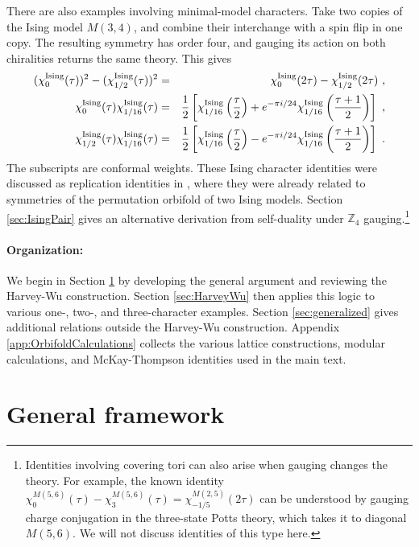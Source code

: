 \documentclass[12pt]{article}
\numberwithin{equation}{section}
\newcommand{\bea}{\begin{eqnarray}}
\newcommand{\eea}{\end{eqnarray}}
\def\no{\nonumber}
\theoremstyle{remark}
\begin{document}
There are also examples involving minimal-model characters. Take two copies of the Ising model $M(3,4)$, and combine their interchange with a spin flip in one copy. The resulting symmetry has order four, and gauging its action on both chiralities returns the same theory.  This gives
\bea 
\label{eq:IsingPairRelations}
(\chi^{\mathrm{Ising}}_0(\tau))^2-(\chi^{\mathrm{Ising}}_{1/2}(\tau))^2
&=&\chi^{\mathrm{Ising}}_0(2\tau)-\chi^{\mathrm{Ising}}_{1/2}(2\tau)~,\no\\
\chi^{\mathrm{Ising}}_0(\tau)\chi^{\mathrm{Ising}}_{1/16}(\tau)
&=&{1\over2}\left[\chi^{\mathrm{Ising}}_{1/16}\left({\tau\over2}\right)+e^{-\pi i/24}\chi^{\mathrm{Ising}}_{1/16}\left({\tau+1\over2}\right)\right]~,\no\\
\chi^{\mathrm{Ising}}_{1/2}(\tau)\chi^{\mathrm{Ising}}_{1/16}(\tau)
&=&{1\over2}\left[\chi^{\mathrm{Ising}}_{1/16}\left({\tau\over2}\right)-e^{-\pi i/24}\chi^{\mathrm{Ising}}_{1/16}\left({\tau+1\over2}\right)\right]~.
\eea
The subscripts are conformal weights. These Ising character identities were discussed as replication identities in \cite{Bantay:2016nkw}, where they were already related to symmetries of the permutation orbifold of two Ising models. Section \ref{sec:IsingPair} gives an alternative derivation from self-duality under $\mathbb Z_4$ gauging.\footnote{Identities involving covering tori can also arise when gauging changes the theory. For example, the known identity $\chi^{M(5,6)}_0(\tau)-\chi^{M(5,6)}_3(\tau)=\chi^{M(2,5)}_{-1/5}(2\tau)$ \cite{Bytsko:1998tb,Feingold:2013toa} can be understood by gauging charge conjugation in the three-state Potts theory, which takes it to diagonal $M(5,6)$. We will not discuss identities of this type here.}


\paragraph{Organization:} We begin in Section \ref{sec:criterion} by developing the general argument and reviewing the Harvey-Wu construction. Section \ref{sec:HarveyWu} then applies this logic to various one-, two-, and three-character examples. Section \ref{sec:generalized} gives additional relations outside the Harvey-Wu construction.
Appendix \ref{app:OrbifoldCalculations} collects the various lattice constructions, modular calculations, and McKay-Thompson identities used in the main text.


\section{General framework}
\label{sec:criterion}
\end{document}
